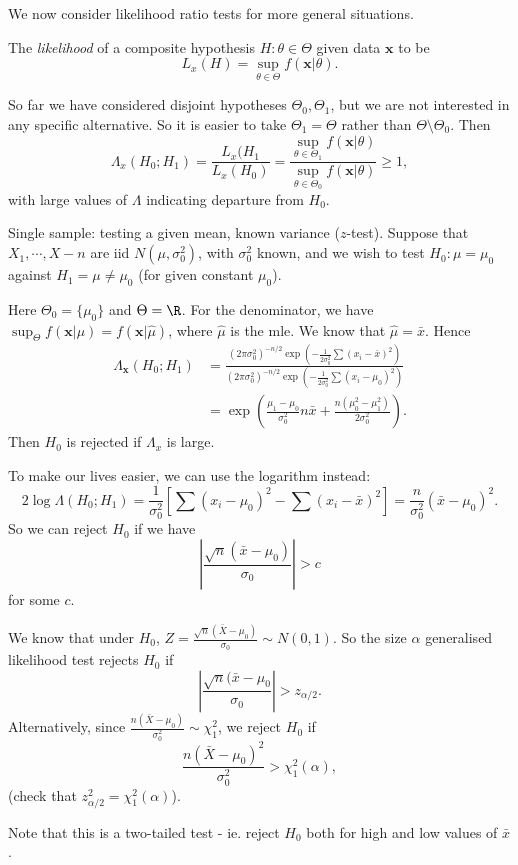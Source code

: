 \documentclass[a4paper]{article}
\begin{document}
We now consider likelihood ratio tests for more general situations.
\begin{defi}
  The \emph{likelihood} of a composite hypothesis $H:\theta\in \Theta$ given data $\mathbf{x}$ to be
  \[
    L_x(H) = \sup_{\theta\in \Theta}f(\mathbf{x}|\theta).
  \]
\end{defi}
So far we have considered disjoint hypotheses $\Theta_0, \Theta_1$, but we are not interested in any specific alternative. So it is easier to take $\Theta_1 = \Theta$ rather than $\Theta \setminus\Theta_0$. Then
\[
  \Lambda_x (H_0; H_1) = \frac{L_x(H_1}{L_x(H_0)}=\frac{\sup_{\theta\in \Theta_1}f(\mathbf{x}|\theta)}{\sup_{\theta\in \Theta_0}f(\mathbf{x}|\theta)} \geq 1,
\]
with large values of $\Lambda$ indicating departure from $H_0$.

\begin{eg}
  Single sample: testing a given mean, known variance ($z$-test). Suppose that $X_1, \cdots, X-n$ are iid $N(\mu, \sigma_0^2)$, with $\sigma_0^2$ known, and we wish to test $H_0: \mu = \mu_0$ against $H_1 = \mu \not= \mu_0$ (for given constant $\mu_0$).

  Here $\Theta_0 = \{\mu_0\}$ and $\Theta = \R$.
  For the denominator, we have $\sup_\Theta f(\mathbf{x}|\mu) = f(\mathbf{x}|\hat{\mu})$, where $\hat{\mu}$ is the mle. We know that $\hat{\mu} = \bar x$. Hence
  \begin{align*}
    \Lambda_\mathbf{x}(H_0; H_1) &= \frac{(2\pi\sigma_0^2)^{-n/2}\exp\left(-\frac{1}{2\sigma^2_0}\sum(x_i - \bar x)^2\right)}{(2\pi\sigma_0^2)^{-n/2}\exp\left(-\frac{1}{2\sigma^2_0}\sum(x_i - \mu_0)^2\right)}\\
    &= \exp\left(\frac{\mu_1 - \mu_0}{\sigma_0^2}n\bar x + \frac{n(\mu_0^2 - \mu_1^2)}{2\sigma_0^2}\right).
  \end{align*}
  Then $H_0$ is rejected if $\Lambda_x$ is large.

  To make our lives easier, we can use the logarithm instead:
  \[
    2\log \Lambda(H_0;H_1) = \frac{1}{\sigma_0^2}\left[\sum (x_i - \mu_0)^2 - \sum (x_i - \bar x)^2\right] = \frac{n}{\sigma_0^2}(\bar x - \mu_0)^2.
  \]
  So we can reject $H_0$ if we have
  \[
    \left|\frac{\sqrt{n}(\bar x - \mu_0)}{\sigma_0}\right| > c
  \]
  for some $c$.

  We know that under $H_0$, $\displaystyle Z = \frac{\sqrt{n}(\bar X - \mu_0)}{\sigma_0}\sim N(0, 1)$. So the size $\alpha$ generalised likelihood test rejects $H_0$ if
  \[
    \left|\frac{\sqrt{n}(\bar x - \mu_0}{\sigma_0}\right| > z_{\alpha/2}.
  \]
  Alternatively, since $\displaystyle \frac{n(\bar X - \mu_0)}{\sigma_0^2}\sim \chi_1^2$, we reject $H_0$ if
  \[
    \frac{n(\bar X - \mu_0)^2}{\sigma_0^2} > \chi_1^2(\alpha),
  \]
  (check that $z_{\alpha/2}^2 = \chi_1^2(\alpha)$).

  Note that this is a two-tailed test - ie. reject $H_0$ both for high and low values of $\bar x$.
\end{eg}
\end{document}
